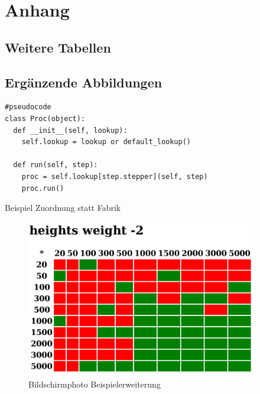 \appendix
\chapter{Anhang}
\section{Weitere Tabellen}




\section{Ergänzende Abbildungen}

\begin{listing}[h]
    \centering
\begin{verbatim}
#pseudocode
class Proc(object):
  def __init__(self, lookup):
    self.lookup = lookup or default_lookup()

  def run(self, step):
    proc = self.lookup[step.stepper](self, step)
    proc.run()
\end{verbatim}
\caption{Beispiel Zuordnung statt Fabrik}
\label{fig:fabrik-mapping}
\end{listing}


\begin{figure}
    \centering
    \includegraphics[width=4in]{images/exemplar-ausgabe.png}
    \caption{Bildschirmphoto Beispielerweiterung}
    \label{fig:beispielerweiterung-screenshoot}
\end{figure}

